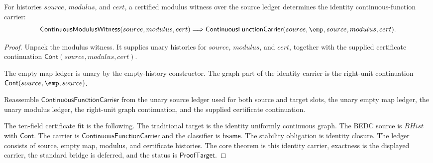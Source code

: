 \begin{theorem}
\label{thm:continuous-function-carrier-empty-map-identity}
For histories $source$, $modulus$, and $cert$, a certified modulus witness over
the source ledger determines the identity continuous-function carrier:
$$
\mathsf{ContinuousModulusWitness}(source,modulus,cert)
\Longrightarrow
\mathsf{ContinuousFunctionCarrier}(source,\emp,source,modulus,cert).
$$
\end{theorem}
\begin{proof}
Unpack the modulus witness. It supplies unary histories for $source$, $modulus$,
and $cert$, together with the supplied certificate continuation
$\mathsf{Cont}(source,modulus,cert)$.

The empty map ledger is unary by the empty-history constructor. The graph part of
the identity carrier is the right-unit continuation
$\mathsf{Cont}(source,\emp,source)$.

Reassemble $\mathsf{ContinuousFunctionCarrier}$ from the unary source ledger
used for both source and target slots, the unary empty map ledger, the unary
modulus ledger, the right-unit graph continuation, and the supplied certificate
continuation.

The ten-field certificate fit is the following. The traditional target is the
identity uniformly continuous graph. The BEDC source is $BHist$ with
$\mathsf{Cont}$. The carrier is $\mathsf{ContinuousFunctionCarrier}$ and the
classifier is $\mathsf{hsame}$. The stability obligation is identity closure.
The ledger consists of source, empty map, modulus, and certificate histories.
The core theorem is this identity carrier, exactness is the displayed carrier,
the standard bridge is deferred, and the status is $\mathsf{ProofTarget}$.
\end{proof}

